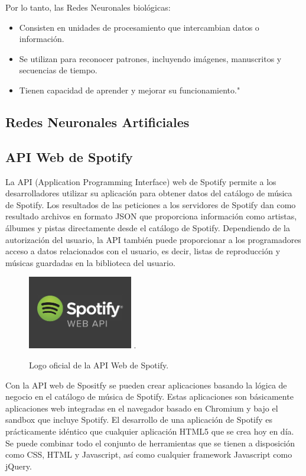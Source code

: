 \documentclass[conference]{IEEEtran}
\begin{document}
Por lo tanto, las Redes Neuronales biológicas:

\begin{itemize}
	\item Consisten en unidades de procesamiento que intercambian datos o información.
	\item Se utilizan para reconocer patrones, incluyendo imágenes, manuscritos y secuencias de tiempo.
	\item Tienen capacidad de aprender y mejorar su funcionamiento."\cite{walter}
\end{itemize}

\subsection{Redes Neuronales Artificiales \\}


\subsection{API Web de Spotify \\}
La API (Application Programming Interface) web de Spotify permite a los desarrolladores utilizar su aplicación para obtener datos del catálogo de música de Spotify. Los resultados de las peticiones a los servidores de Spotify dan como resultado archivos en formato JSON que proporciona información como artistas, álbumes y pistas directamente desde el catálogo de Spotify. Dependiendo de la autorización del usuario, la API también puede proporcionar a los programadores acceso a datos relacionados con el usuario, es decir, listas de reproducción y músicas guardadas en la biblioteca del usuario.\\

\begin{figure}[ht]
    \centering
    \includegraphics[width=1.8in]{./images/APIWebSpotify.jpg}
    \DeclareGraphicsExtensions.
    \caption{ Logo oficial de la API Web de Spotify. }
\end{figure}

Con la API web de Spositfy se pueden crear aplicaciones basando la lógica de negocio en el catálogo de música de Spotify. Estas aplicaciones son básicamente aplicaciones web integradas en el navegador basado en Chromium y bajo el sandbox que incluye Spotify. El desarrollo de una aplicación de Spotify es prácticamente idéntico que cualquier aplicación HTML5 que se crea hoy en día. Se puede combinar todo el conjunto de herramientas que se tienen a disposición como CSS, HTML y Javascript, así como cualquier framework Javascript como jQuery.
\end{document}
